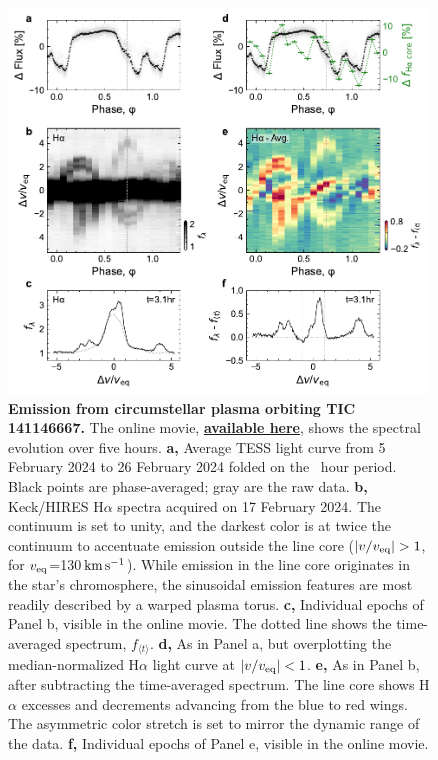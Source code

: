 \documentclass[11pt,twocolumn,tighten,linenumbers]{aastex7}
\newcommand{\kms}{\ensuremath{\rm km\,s^{-1}}}
\begin{document}
\begin{figure}[!t]
  \centering
  \includegraphics[width=0.99\textwidth]{f3.pdf}
  \vspace{-0.25cm}
  \captionsetup{labelformat=moviefmt,labelsep=colon}
	\caption{\textbf{Emission from circumstellar plasma orbiting
TIC\,141146667.}
  The online movie,
  \href{https://lgbouma.com/movies/TIC141146667_sixpanel.mp4}{{\bf
  available here}},
  shows the spectral evolution over five hours.
  {\bf a,} Average TESS light curve from 5 February 2024 to 26
  February 2024 folded on the \periodhr\ hour period.  Black
  points are phase-averaged; gray are the raw data.
  {\bf b,} Keck/HIRES H$\alpha$ spectra acquired on 17
  February 2024.  The continuum is set to unity, and the darkest color
  is at twice the continuum to accentuate emission outside the line
  core ($|v/v_{\rm eq}|>1$, for $v_{\rm eq}$=130\,\kms).  While
  emission in the line core originates in the star's chromosphere,
  the sinusoidal emission features are most readily described by a
  warped plasma torus.
  {\bf c,} Individual epochs of Panel b, visible in the
  online movie.  The dotted line shows the time-averaged spectrum,
  $f_{\langle t \rangle}$.
  {\bf d,} As in Panel a, but overplotting the
  median-normalized H$\alpha$ light curve at $|v/v_{\rm eq}|<1$.
  {\bf e,} As in Panel b, after subtracting the time-averaged
  spectrum.  The line core shows H$\alpha$ excesses and decrements
  advancing from the blue to red wings.
  The asymmetric color stretch
  is set to mirror the dynamic range of the data.
  {\bf f,} Individual epochs of Panel e, visible in the online
  movie.}
  \label{fig:spec}
\end{figure}
\end{document}
